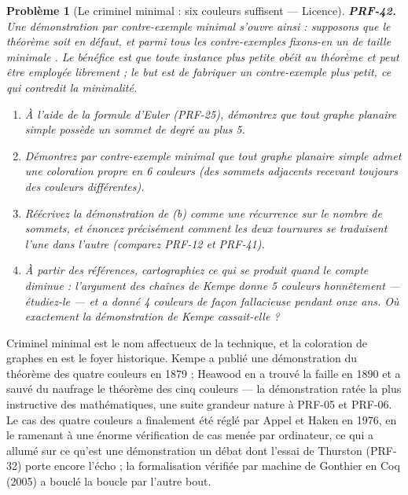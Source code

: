 \documentclass[11pt]{article}
\newtheorem{problem}{Problème}
\begin{document}
\bigskip

\begin{problem}[{Le criminel minimal : six couleurs suffisent --- Licence}]
\textbf{PRF-42.} Une démonstration par contre-exemple minimal s'ouvre ainsi :
\og{} supposons que le théorème soit en défaut, et parmi tous les contre-exemples fixons-en un
de taille minimale \fg{}. Le bénéfice est que toute instance plus petite obéit au théorème et
peut être employée librement ; le but est de fabriquer un contre-exemple plus petit, ce qui
contredit la minimalité.
\begin{enumerate}
\item[(a)] À l'aide de la formule d'Euler (PRF-25), démontrez que tout graphe planaire simple
possède un sommet de degré au plus 5.
\item[(b)] Démontrez par contre-exemple minimal que tout graphe planaire simple admet une
coloration propre en 6 couleurs (des sommets adjacents recevant toujours des couleurs
différentes).
\item[(c)] Réécrivez la démonstration de (b) comme une récurrence sur le nombre de sommets, et
énoncez précisément comment les deux tournures se traduisent l'une dans l'autre (comparez
PRF-12 et PRF-41).
\item[(d)] À partir des références, cartographiez ce qui se produit quand le compte diminue :
l'argument des chaînes de Kempe donne 5 couleurs honnêtement --- étudiez-le --- et a donné 4
couleurs de façon fallacieuse pendant onze ans. Où exactement la démonstration de Kempe
cassait-elle ?
\end{enumerate}

\end{problem}

\noindent \og{} Criminel minimal \fg{} est le nom affectueux de la technique, et la
coloration de graphes en est le foyer historique. Kempe a publié une démonstration du
théorème des quatre couleurs en 1879 ; Heawood en a trouvé la faille en 1890 et a sauvé du
naufrage le théorème des cinq couleurs --- la démonstration ratée la plus instructive des
mathématiques, une suite grandeur nature à PRF-05 et PRF-06. Le cas des quatre couleurs a
finalement été réglé par Appel et Haken en 1976, en le ramenant à une énorme vérification de
cas menée par ordinateur, ce qui a allumé sur ce qu'est une démonstration un débat dont
l'essai de Thurston (PRF-32) porte encore l'écho ; la formalisation vérifiée par machine de
Gonthier en Coq (2005) a bouclé la boucle par l'autre bout.
\end{document}
